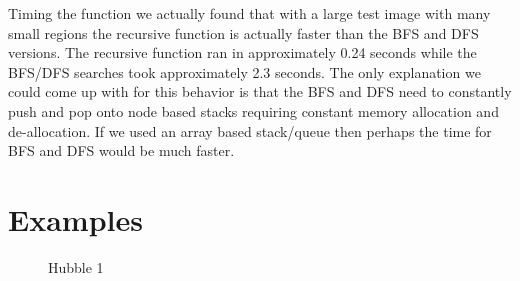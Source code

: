 \documentclass[pdftex, 11pt]{article}
\begin{document}
		Timing the function we actually found that with a large test image with many small regions the recursive
		function is actually faster than the BFS and DFS versions.  The recursive function ran in
		approximately 0.24 seconds while the BFS/DFS searches took approximately 2.3 seconds.  The only explanation we
		could come up with for this behavior is that the BFS and DFS need to constantly push and pop onto node based
		stacks requiring constant memory allocation and de-allocation.  If we used an array based stack/queue then
		perhaps the time for BFS and DFS would be much faster.

		\section{Examples}
		\begin{figure}
			\centering
			\caption{Hubble 1}
		\end{figure}
\end{document}
